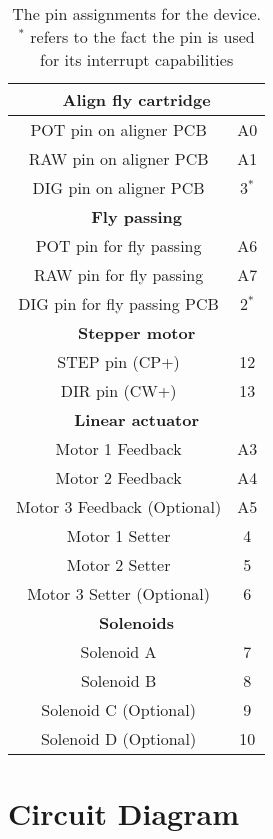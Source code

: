 \documentclass[12pt]{article}
\begin{document}
\begin{table}[H]
	\centering
	\begin{tabular}{c c}
		\multicolumn{2}{c}{\textbf{Align fly cartridge}}\\ \midrule
		POT pin on aligner PCB & A0 \\
		RAW pin on aligner PCB & A1 \\
		DIG pin on aligner PCB & 3$^*$ \\ \midrule
		\multicolumn{2}{c}{\textbf{Fly passing}}\\ \midrule
		POT pin for fly passing & A6 \\
		RAW pin for fly passing & A7 \\
		DIG pin for fly passing PCB & 2$^*$ \\ \midrule
		\multicolumn{2}{c}{\textbf{Stepper motor}}\\ \midrule
		STEP pin (CP+) & 12 \\
		DIR pin (CW+) & 13 \\ \midrule
		\multicolumn{2}{c}{\textbf{Linear actuator}}\\ \midrule
		Motor 1 Feedback & A3 \\
		Motor 2 Feedback & A4 \\
		Motor 3 Feedback (Optional) & A5 \\
		Motor 1 Setter & 4 \\
		Motor 2 Setter & 5\\		
		Motor 3 Setter (Optional) & 6\\ \midrule
		\multicolumn{2}{c}{\textbf{Solenoids}}\\ \midrule
		Solenoid A & 7 \\
		Solenoid B & 8 \\
		Solenoid C (Optional) & 9 \\
		Solenoid D (Optional) & 10\\
	\end{tabular}
	\caption{The pin assignments for the device. $^*$ refers to the fact the pin is used for its interrupt capabilities}
\end{table}

\section{Circuit Diagram}

\end{document}
